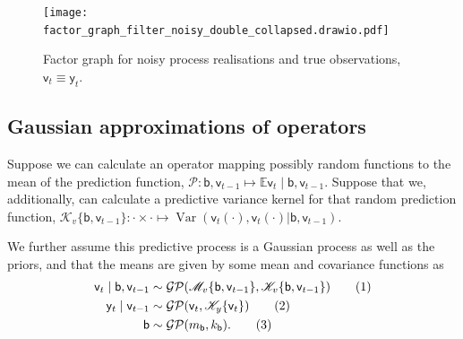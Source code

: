\documentclass{article}
\newcommand\numberthis{\addtocounter{equation}{1}\tag{\theequation}}
\newcommand{\var}{\operatorname{Var}}
\newcommand{\rv}[1]{\mathsf{#1}}
\newcommand{\dist}[1]{\mathcal{#1}}
\newcommand{\op}[1]{\mathscr{#1}}
\newcommand{\gvn}{\mid}
\newcommand{\Ex}{\mathbb{E}}
\newcommand{\lat}{\rv{b}}   %
\begin{document}
\begin{figure}[htb]
  \centering
    \texttt{[image: factor\_graph\_filter\_noisy\_double\_collapsed.drawio.pdf]}
  \caption{Factor graph for noisy process realisations and true observations, \(\rv{v}_{t}\equiv \rv{y}_{t}\).}\label{fig:filteringfgnoisycollapsed2}
\end{figure}

\subsection{Gaussian approximations of operators}

Suppose we can calculate an operator mapping possibly random functions to the mean of the prediction function, \(\op{P}:\lat,\rv{v}_{t-1}\mapsto \Ex\rv{v}_{t}\gvn \lat,\rv{v}_{t-1}\).
Suppose that we, additionally, can calculate a predictive variance kernel for that random prediction function,
\(\op{K}_{v}\{\lat,\rv{v}_{t-1}\}: \cdot \times \cdot \mapsto \var\left(\rv{v}_{t}(\cdot), \rv{v}_{t}(\cdot)|\lat,\rv{v}_{t-1}\right)\).

We further assume this predictive process is a Gaussian process as well as the priors, and that the means are given by some mean and covariance functions as
\begin{align*}
\rv{v}_{t}\gvn \lat,\rv{v}_{t-1}
&\sim \dist{GP}(\op{M}_v\{\lat,\rv{v}_{t-1}\},\op{K}_{v}\{\lat,\rv{v}_{t-1}\})
\numberthis \label{eq:gp_approx_proc} \\
\rv{y}_{t}\gvn \rv{v}_{t-1}
&\sim \dist{GP}(\rv{v}_{t},\op{K}_{y}\{\rv{v}_{t}\})
\numberthis \label{eq:gp_approx_obs} \\
\lat &\sim \dist{GP}(m_{\lat},k_{\lat}).
\numberthis \label{eq:gp_approx_prior}
\end{align*}

\end{document}
